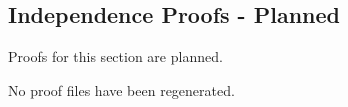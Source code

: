\subsection*{Independence Proofs - Planned}

\begin{remark*}
Proofs for this section are planned.
\end{remark*}

\begin{remark*}
No proof files have been regenerated.
\end{remark*}

